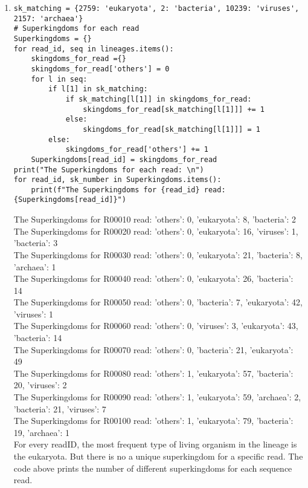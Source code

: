 \documentclass[12 pt,a4paper]{article}
\begin{document}
\begin{enumerate}
\begin{verbatim}
print("{The LCAs for each read: \n", LCAs)
\end{verbatim}
The LCA for each read is the root, so the taxonomic rank is "no rank".
\item 
\begin{verbatim}
sk_matching = {2759: 'eukaryota', 2: 'bacteria', 10239: 'viruses', 2157: 'archaea'}
# Superkingdoms for each read
Superkingdoms = {}
for read_id, seq in lineages.items():
    skingdoms_for_read ={}
    skingdoms_for_read['others'] = 0
    for l in seq:
        if l[1] in sk_matching:
            if sk_matching[l[1]] in skingdoms_for_read:
                skingdoms_for_read[sk_matching[l[1]]] += 1
            else:
                skingdoms_for_read[sk_matching[l[1]]] = 1
        else:
            skingdoms_for_read['others'] += 1
    Superkingdoms[read_id] = skingdoms_for_read
print("The Superkingdoms for each read: \n")
for read_id, sk_number in Superkingdoms.items():
    print(f"The Superkingdoms for {read_id} read: {Superkingdoms[read_id]}")
\end{verbatim}
The Superkingdoms for R00010 read: 'others': 0, 'eukaryota': 8, 'bacteria': 2 \\
The Superkingdoms for R00020 read: 'others': 0, 'eukaryota': 16, 'viruses': 1, 'bacteria': 3 \\
The Superkingdoms for R00030 read: 'others': 0, 'eukaryota': 21, 'bacteria': 8, 'archaea': 1 \\
The Superkingdoms for R00040 read: 'others': 0, 'eukaryota': 26, 'bacteria': 14 \\
The Superkingdoms for R00050 read: 'others': 0, 'bacteria': 7, 'eukaryota': 42, 'viruses': 1 \\
The Superkingdoms for R00060 read: 'others': 0, 'viruses': 3, 'eukaryota': 43, 'bacteria': 14 \\
The Superkingdoms for R00070 read: 'others': 0, 'bacteria': 21, 'eukaryota': 49 \\
The Superkingdoms for R00080 read: 'others': 1, 'eukaryota': 57, 'bacteria': 20, 'viruses': 2 \\
The Superkingdoms for R00090 read: 'others': 1, 'eukaryota': 59, 'archaea': 2, 'bacteria': 21, 'viruses': 7 \\
The Superkingdoms for R00100 read: 'others': 1, 'eukaryota': 79, 'bacteria': 19, 'archaea': 1 \\

For every readID, the most frequent type of living organism in the lineage is the eukaryota. But there is no a unique superkingdom for a specific read. The code above prints the number of different superkingdoms for each sequence read.


\end{enumerate}
\end{document}
